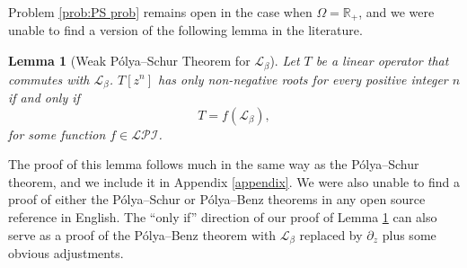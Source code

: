 \documentclass[reqno]{amsart}
\newcommand{\1}{\mathbf{1}}
\newcommand{\R}{\mathbb{R}}
\def\R{\mathbb{R}}
\theoremstyle{plain}
\newtheorem{lemma}[theorem]{Lemma}
\theoremstyle{definition}
\theoremstyle{remark}
\numberwithin{equation}{section}
\begin{document}
Problem \ref{prob:PS prob} remains open in the case when $\Omega=\R_+$, and we were unable to find a version of the following lemma in the literature.
\begin{lemma}[Weak P\'olya--Schur Theorem for $\mathscr{L}_{\beta}$]\label{lem:PS for rect}
	Let $T$ be a linear operator that commutes with $\mathscr{L}_{\beta}$. $T[z^n]$ has only non-negative roots for every positive integer $n$  if and only if  \begin{equation}
		T=f(\mathscr{L}_{\beta}),
	\end{equation} for some function $f\in\mathcal{LPI}$.
\end{lemma} The proof of this lemma follows much in the same way as the P\'olya--Schur theorem, and we include it in Appendix \ref{appendix}. We were also unable to find a proof of either the P\'olya--Schur or P\'olya--Benz theorems in any open source reference in English. The ``only if'' direction of our proof of Lemma \ref{lem:PS for rect} can also serve as a proof of the P\'olya--Benz theorem with $\mathscr{L}_{\beta}$ replaced by $\partial_{z}$ plus some obvious adjustments. 
\end{document}
